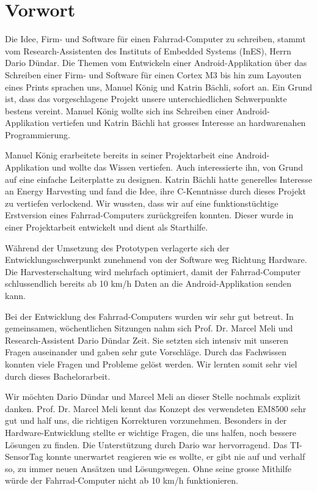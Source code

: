\chapter*{Vorwort}

Die Idee, Firm- und Software für einen Fahrrad-Computer zu schreiben, stammt vom Research-Assistenten des Instituts of Embedded Systems (InES), Herrn Dario Dündar. Die Themen vom Entwickeln einer Android-Applikation über das Schreiben einer Firm- und Software für einen Cortex M3 bis hin zum Layouten eines Prints sprachen uns, Manuel König und Katrin Bächli, sofort an. Ein Grund ist, dass das vorgeschlagene Projekt unsere unterschiedlichen Schwerpunkte bestens vereint. 
Manuel König wollte sich ins Schreiben einer Android-Applikation vertiefen und Katrin Bächli hat grosses Interesse an hardwarenahen Programmierung.  

Manuel König erarbeitete bereits in seiner Projektarbeit eine Android-Applikation und wollte das Wissen vertiefen. Auch interessierte ihn, von Grund auf eine einfache Leiterplatte zu designen. Katrin Bächli hatte generelles Interesse an Energy Harvesting und fand die Idee, ihre C-Kenntnisse durch dieses Projekt zu vertiefen verlockend. Wir wussten, dass wir auf eine funktionstüchtige Erstversion eines Fahrrad-Computers zurückgreifen konnten. Dieser wurde in einer Projektarbeit entwickelt und dient als Starthilfe.

Während der Umsetzung des Prototypen verlagerte sich der Entwicklungsschwerpunkt zunehmend von der Software weg Richtung Hardware. Die Harvesterschaltung wird mehrfach optimiert, damit der Fahrrad-Computer schlussendlich bereits ab 10 km/h Daten an die Android-Applikation senden kann.

Bei der Entwicklung des Fahrrad-Computers wurden wir sehr gut betreut. In gemeinsamen, wöchentlichen Sitzungen nahm sich Prof. Dr. Marcel Meli und Research-Assistent Dario Dündar Zeit. Sie setzten sich intensiv mit unseren Fragen auseinander und gaben sehr gute Vorschläge. Durch das Fachwissen konnten viele Fragen und Probleme gelöst werden. Wir lernten somit sehr viel durch dieses Bachelorarbeit. 

Wir möchten Dario Dündar und Marcel Meli an dieser Stelle nochmals explizit danken. Prof. Dr. Marcel Meli kennt das Konzept des verwendeten EM8500 sehr gut und half uns, die richtigen Korrekturen vorzunehmen. Besonders in der Hardware-Entwicklung stellte er wichtige Fragen, die uns halfen, noch bessere Lösungen zu finden. Die Unterstützung durch Dario war hervorragend. Das TI-SensorTag konnte unerwartet reagieren wie es wollte, er gibt nie auf und verhalf so, zu immer neuen Ansätzen und Lösungswegen. Ohne seine grosse Mithilfe würde der Fahrrad-Computer nicht ab 10 km/h funktionieren. 

